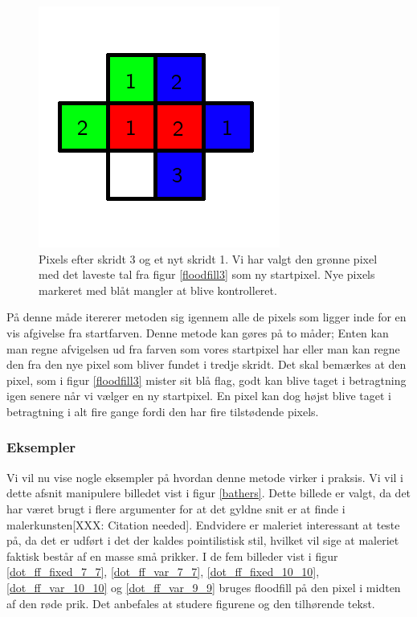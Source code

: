 {\begin{figure}[!h]
    \begin{center}
        \includegraphics[scale=0.42,angle=0]{afsnit/vores_implementation/billeder/flood_fill/floodfill4}
    \end{center}
    \caption[]{Pixels efter skridt 3 og et nyt skridt 1. Vi har valgt
    den grønne pixel med det laveste tal fra figur \ref{floodfill3} som
    ny startpixel. Nye pixels markeret med blåt mangler at blive
    kontrolleret.}
    \label{floodfill4}
\end{figure}

På denne måde itererer metoden sig igennem alle de pixels som ligger
inde for en vis afgivelse fra startfarven. Denne metode kan gøres på to
måder; Enten kan man regne afvigelsen ud fra farven som vores startpixel
har eller man kan regne den fra den nye pixel som bliver fundet i tredje
skridt. Det skal bemærkes at den pixel, som i figur \ref{floodfill3}
mister sit blå flag, godt kan blive taget i betragtning igen senere når
vi vælger en ny startpixel. En pixel kan dog højst blive taget i
betragtning i alt fire gange fordi den har fire tilstødende pixels.

\subsubsection{Eksempler}
Vi vil nu vise nogle eksempler på hvordan denne metode virker i praksis.
Vi vil i dette afsnit manipulere billedet vist i figur \ref{bathers}.
Dette billede er valgt, da det har været brugt i flere argumenter for at
det gyldne snit er at finde i malerkunsten[XXX: Citation needed].
Endvidere er maleriet interessant at teste på, da det er udført i det
der kaldes pointilistisk stil, hvilket vil sige at maleriet faktisk
består af en masse små prikker. I de fem billeder vist i figur
\ref{dot_ff_fixed_7_7}, \ref{dot_ff_var_7_7}, \ref{dot_ff_fixed_10_10},
\ref{dot_ff_var_10_10} og \ref{dot_ff_var_9_9} bruges floodfill på den
pixel i midten af den røde prik. Det anbefales at studere figurene og
den tilhørende tekst.

}
